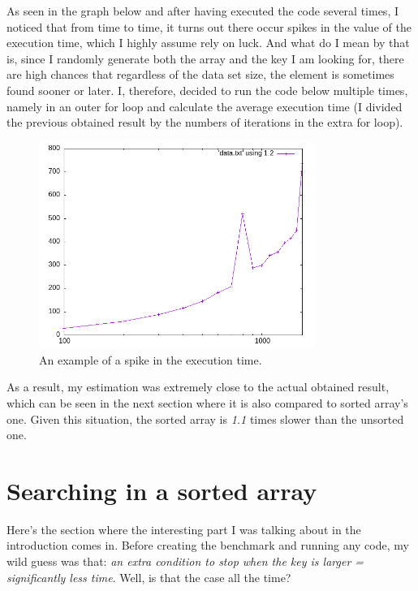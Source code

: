 \documentclass[a4paper,11pt]{article}
\begin{document}
As seen in the graph below and after having executed the code several times, I noticed that from time to time, it turns out 
there occur spikes in the value of the execution time, 
which I highly assume rely on luck. 
And what do I mean by that is, since I randomly generate both the array and the key I am looking for, there are high chances that
regardless of the 
data set size, the element is sometimes found sooner or later. I, therefore, decided to run the code below multiple times, namely in an outer for loop
and calculate the average execution time (I divided the previous obtained result by the numbers of 
iterations in the extra for loop). \newline 



  \begin{figure}[ht]
    \centering
    \includegraphics[width=0.8\textwidth]{plot.png}
    \caption{An example of a spike in the execution time.}
    \label{fig:1}
\end{figure}


As a result, my estimation was extremely close to the actual obtained result, which can be seen in the next section where it 
is also compared to sorted array's one. Given this situation, the sorted array is \textit{1.1} times slower than the unsorted one. 


\section*{Searching in a sorted array}

Here's the section where the interesting part I was talking about in the introduction comes in. Before creating the benchmark and running any code,
my wild guess was that: \textit{an extra condition to stop when the key is larger = significantly less time}. Well, is that the case all the time?
\end{document}
